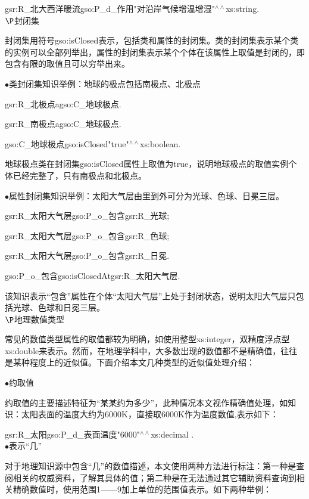 gsr:R\_北大西洋暖流\quad gso:P\_d\_作用\quad "对沿岸气候增温增湿"$^{\land\land}$xs:string\quad .
	\\
	
$\P$封闭集

封闭集用符号gso:isClosed表示，包括类和属性的封闭集。类的封闭集表示某个类的实例可以全部列举出，属性的封闭集表示某个个体在该属性上取值是封闭的，即包含有限的取值且可以穷举出来。

	$\bullet$类封闭集知识举例：地球的极点包括南极点、北极点

gsr:R\_北极点\quad a\quad gso:C\_地球极点\quad .

gsr:R\_南极点\quad a\quad gso:C\_地球极点\quad .

gso:C\_地球极点\quad gso:isClosed\quad "true"$^{\land\land}$xs:boolean\quad .

地球极点类在封闭集gso:isClosed属性上取值为true，说明地球极点的取值实例个体已经完整了，只有南极点和北极点。

$\bullet$属性封闭集知识举例：太阳大气层由里到外可分为光球、色球、日冕三层。

gsr:R\_太阳大气层\quad gso:P\_o\_包含\quad gsr:R\_光球\quad ;

gsr:R\_太阳大气层\quad gso:P\_o\_包含\quad gsr:R\_色球\quad ;

gsr:R\_太阳大气层\quad gso:P\_o\_包含\quad gsr:R\_日冕\quad .

gso:P\_o\_包含\quad gso:isClosedAt\quad gsr:R\_太阳大气层\quad.

该知识表示“包含”属性在个体“太阳大气层”上处于封闭状态，说明太阳大气层只包括光球、色球和日冕三层。
	\\

$\P$地理数值类型

常见的数值类型属性的取值都较为明确，如使用整型xs:integer，双精度浮点型xs:double来表示。然而，在地理学科中，大多数出现的数值都不是精确值，往往是某种程度上的近似值。下面介绍本文几种类型的近似值处理介绍：

$\bullet$约取值

约取值的主要描述特征为“某某约为多少”，此种情况本文视作精确值处理，如知识：太阳表面的温度大约为6000K，直接取6000K作为温度数值,表示如下：

gsr:R\_太阳\quad gso:P\_d\_表面温度\quad "6000"$^{\land\land}$xs:decimal .
\\

$\bullet$表示“几”

对于地理知识源中包含“几”的数值描述，本文使用两种方法进行标注：第一种是查阅相关的权威资料，了解其具体的值；第二种是在无法通过其它辅助资料查询到相关精确数值时，使用范围1——9加上单位的范围值表示。如下两种举例：

